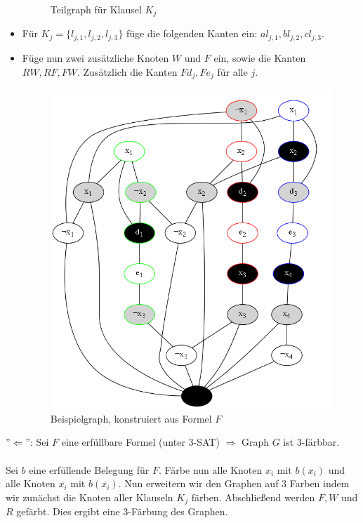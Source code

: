 \documentclass{article} %
\begin{document}
\begin{itemize}
\begin{figure}[!htp]
		\caption{Teilgraph für Klausel $K_j$}
	\end{figure}
	\item Für $K_j = \{l_{j,1}, l_{j,2}, l_{j,3}\}$ füge die folgenden Kanten ein: $al_{j,1}, bl_{j,2}, cl_{j,3}$.
	\item Füge nun zwei zusätzliche Knoten $W$ und $F$ ein, sowie die Kanten $RW, RF, FW$. Zusätzlich die Kanten $Fd_j, Fe_j$ für alle $j$.
	\begin{figure}[!htp]
		\centering
		\includegraphics[scale=0.5]{img/3Sat_3Col_example.png}
		\caption{Beispielgraph, konstruiert aus Formel $F$}
	\end{figure}
\end{itemize}
\newpage
''$\Leftarrow$'': Sei $F$ eine erfüllbare Formel (unter 3-SAT) $\Rightarrow$ Graph $G$ ist 3-färbbar.\\
\\
Sei $b$ eine erfüllende Belegung für $F$. Färbe nun alle Knoten $x_i$ mit $b(x_i)$ und alle Knoten $\overline{x_i}$ mit $b(\overline{x_i})$. Nun erweitern wir den Graphen auf 3 Farben indem wir zunächst die Knoten aller Klauseln $K_j$ färben. Abschließend werden $F, W$ und $R$ gefärbt. Dies ergibt eine 3-Färbung des Graphen.
\end{document}
